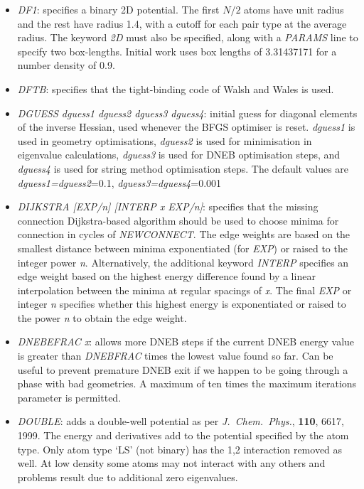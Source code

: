 \documentclass[12pt,a4paper,dvips]{article}
\begin{document}
\begin{itemize}
\item {\it DF1\/}: specifies a binary 2D potential.
The first $N/2$ atoms have unit radius and the rest 
have radius 1.4, with a cutoff for each pair type at the
average radius.
The keyword {\it 2D\/} must also be specified, along with a 
{\it PARAMS\/} line to specify two box-lengths.
Initial work uses box lengths of 3.31437171 for a number density of 0.9.

\item {\it DFTB\/}: specifies that the tight-binding code of Walsh and Wales\cite{WalshW98}
      is used.

\item {\it DGUESS dguess1 dguess2 dguess3 dguess4\/}: initial guess for diagonal elements of the inverse
      Hessian, used whenever the BFGS optimiser is reset. {\it dguess1\/} is used in
      geometry optimisations, {\it dguess2\/} is used for minimisation in
      eigenvalue calculations, {\it dguess3\/} is used for DNEB optimisation
      steps, and {\it dguess4\/} is used for string method optimisation steps.
      The default values are {\it dguess1=dguess2}=0.1, {\it dguess3=dguess4}=0.001

\item {\it DIJKSTRA [EXP/n] [INTERP x EXP/n]\/}: specifies that the missing connection
Dijkstra-based algorithm\cite{CarrTW05} should be used to choose minima for connection in cycles
of {\it NEWCONNECT\/}.
The edge weights are based on the smallest distance between minima exponentiated (for {\it EXP}) or
raised to the integer power {\it n}.
Alternatively, the additional keyword {\it INTERP\/} specifies an edge weight based on
the highest energy difference found by a linear interpolation between the minima at regular spacings
of {\it x}. 
The final {\it EXP\/} or integer {\it n} specifies whether this highest energy is exponentiated
or raised to the power {\it n} to obtain the edge weight.

\item {\it DNEBEFRAC x\/}: 
allows more DNEB steps if the current DNEB energy value
is greater than {\it DNEBFRAC\/} times the lowest value found so far. Can be useful to
prevent premature DNEB exit if we happen to be going through a phase with bad
geometries. A maximum of ten times the maximum iterations parameter is permitted.

\item {\it DOUBLE\/}: adds a double-well potential as per {\it J.~Chem.~Phys.\/},
        {\bf 110}, 6617, 1999. The
        energy and derivatives add to the potential specified by the atom
        type. Only atom type
        `LS' (not binary) has the 1,2 interaction removed as well.
        At low density some atoms may not interact with any others and
        problems result due to additional zero eigenvalues.


\end{itemize}
\end{document}
